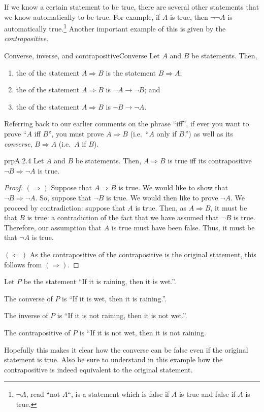 If we know a certain statement to be true, there are several other statements that we know automatically to be true.  For example, if $A$ is true, then $\neg \neg A$ is automatically true.\footnote{$\neg A$, read ``not $A$``, is a statement which is false if $A$ is true and false if $A$ is true.}  Another important example of this is given by the \emph{contrapositive}.
\begin{dfn}{Converse, inverse, and contrapositive}{Converse}
Let $A$ and $B$ be statements.  Then,
\begin{enumerate}
\item the  of the statement $A\Rightarrow B$ is the statement $B\Rightarrow A$;
\item the  of the statement $A\Rightarrow B$ is $\neg A\rightarrow \neg B$; and
\item the  of the statement $A\Rightarrow B$ is $\neg B\rightarrow \neg A$.
\end{enumerate}
\begin{rmk}
Referring back to our earlier comments on the phrase ``iff'', if ever you want to prove ``$A$ iff $B$'', you must prove $A\Rightarrow B$ (i.e.~``$A$ only if $B$.'') as well as its \emph{converse}, $B\Rightarrow A$ (i.e.~$A$ if $B$).
\end{rmk}
\end{dfn}
\begin{prp}{}{prpA.2.4}
Let $A$ and $B$ be statements.  Then, $A\Rightarrow B$ is true iff its contrapositive $\neg B\Rightarrow \neg A$ is true.
\begin{proof}
$(\Rightarrow )$ Suppose that $A\Rightarrow B$ is true.  We would like to show that $\neg B\Rightarrow \neg A$.  So, suppose that $\neg B$ is true.  We would then like to prove $\neg A$.  We proceed by contradiction:  suppose that $A$ is true.  Then, as $A\Rightarrow B$, it must be that $B$ is true:  a contradiction of the fact that we have assumed that $\neg B$ is true.  Therefore, our assumption that $A$ is true must have been false.  Thus, it must be that $\neg A$ is true.

\blankline
\noindent
$(\Leftarrow )$ As the contrapositive of the contrapositive is the original statement, this follows from $(\Rightarrow )$.
\end{proof}
\end{prp}
\begin{exm}{}{}
Let $P$ be the statement ``If it is raining, then it is wet.''.

The converse of $P$ is ``If it is wet, then it is raining.''.

The inverse of $P$ is ``If it is not raining, then it is not wet.''.

The contrapositive of $P$ is ``If it is not wet, then it is not raining.

Hopefully this makes it clear how the converse can be false even if the original statement is true.  Also be sure to understand in this example how the contrapositive is indeed equivalent to the original statement.
\end{exm}

